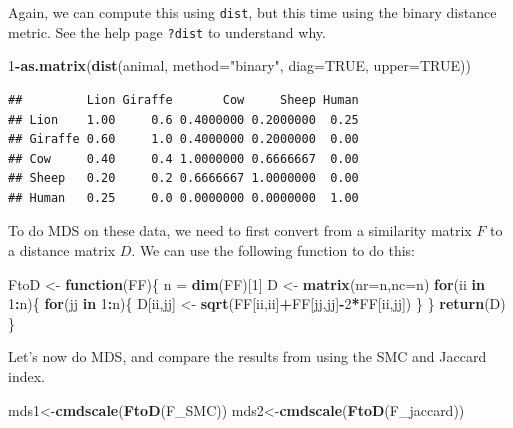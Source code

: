 \documentclass[]{book}
\newenvironment{Shaded}{\begin{snugshade}}{\end{snugshade}}
\newcommand{\ControlFlowTok}[1]{\textcolor[rgb]{0.13,0.29,0.53}{\textbf{#1}}}
\newcommand{\DataTypeTok}[1]{\textcolor[rgb]{0.13,0.29,0.53}{#1}}
\newcommand{\DecValTok}[1]{\textcolor[rgb]{0.00,0.00,0.81}{#1}}
\newcommand{\KeywordTok}[1]{\textcolor[rgb]{0.13,0.29,0.53}{\textbf{#1}}}
\newcommand{\NormalTok}[1]{#1}
\newcommand{\OperatorTok}[1]{\textcolor[rgb]{0.81,0.36,0.00}{\textbf{#1}}}
\newcommand{\OtherTok}[1]{\textcolor[rgb]{0.56,0.35,0.01}{#1}}
\newcommand{\StringTok}[1]{\textcolor[rgb]{0.31,0.60,0.02}{#1}}
\theoremstyle{definition}
\theoremstyle{definition}
\theoremstyle{definition}
\theoremstyle{remark}
\begin{document}
Again, we can compute this using \texttt{dist}, but this time using the binary distance metric. See the help page \texttt{?dist} to understand why.

\begin{Shaded}
\begin{Highlighting}[]
\DecValTok{1}\OperatorTok{-}\KeywordTok{as.matrix}\NormalTok{(}\KeywordTok{dist}\NormalTok{(animal, }\DataTypeTok{method=}\StringTok{"binary"}\NormalTok{, }\DataTypeTok{diag=}\OtherTok{TRUE}\NormalTok{, }\DataTypeTok{upper=}\OtherTok{TRUE}\NormalTok{))}
\end{Highlighting}
\end{Shaded}

\begin{verbatim}
##         Lion Giraffe       Cow     Sheep Human
## Lion    1.00     0.6 0.4000000 0.2000000  0.25
## Giraffe 0.60     1.0 0.4000000 0.2000000  0.00
## Cow     0.40     0.4 1.0000000 0.6666667  0.00
## Sheep   0.20     0.2 0.6666667 1.0000000  0.00
## Human   0.25     0.0 0.0000000 0.0000000  1.00
\end{verbatim}

To do MDS on these data, we need to first convert from a similarity matrix \(F\) to a distance matrix \(D\). We can use the following function to do this:

\begin{Shaded}
\begin{Highlighting}[]
\NormalTok{FtoD <-}\StringTok{ }\ControlFlowTok{function}\NormalTok{(FF)\{}
\NormalTok{  n =}\StringTok{ }\KeywordTok{dim}\NormalTok{(FF)[}\DecValTok{1}\NormalTok{]}
\NormalTok{  D <-}\StringTok{ }\KeywordTok{matrix}\NormalTok{(}\DataTypeTok{nr=}\NormalTok{n,}\DataTypeTok{nc=}\NormalTok{n)}
  \ControlFlowTok{for}\NormalTok{(ii }\ControlFlowTok{in} \DecValTok{1}\OperatorTok{:}\NormalTok{n)\{}
    \ControlFlowTok{for}\NormalTok{(jj }\ControlFlowTok{in} \DecValTok{1}\OperatorTok{:}\NormalTok{n)\{}
\NormalTok{      D[ii,jj] <-}\StringTok{ }\KeywordTok{sqrt}\NormalTok{(FF[ii,ii]}\OperatorTok{+}\NormalTok{FF[jj,jj]}\OperatorTok{-}\DecValTok{2}\OperatorTok{*}\NormalTok{FF[ii,jj])}
\NormalTok{    \}}
\NormalTok{  \}}
  \KeywordTok{return}\NormalTok{(D)}
\NormalTok{\}}
\end{Highlighting}
\end{Shaded}

Let's now do MDS, and compare the results from using the SMC and Jaccard index.

\begin{Shaded}
\begin{Highlighting}[]
\NormalTok{mds1<-}\KeywordTok{cmdscale}\NormalTok{(}\KeywordTok{FtoD}\NormalTok{(F_SMC))}
\NormalTok{mds2<-}\KeywordTok{cmdscale}\NormalTok{(}\KeywordTok{FtoD}\NormalTok{(F_jaccard))}
\end{Highlighting}
\end{Shaded}
\end{document}
